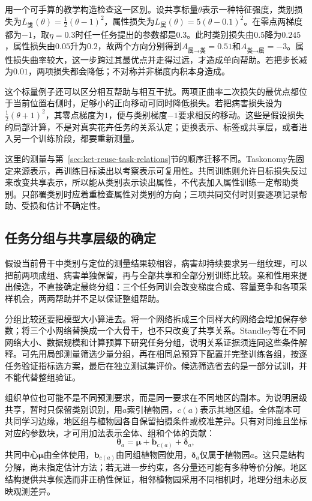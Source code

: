 用一个可手算的教学构造检查这一区别。设共享标量$\theta$表示一种特征强度，类别损失为$L_{\text{类}}(\theta)=\tfrac12(\theta-1)^2$，属性损失为$L_{\text{属}}(\theta)=5(\theta-0.1)^2$。在零点两梯度都为$-1$，取$\eta=0.3$时任一任务提出的参数都是$0.3$。此时类别损失由$0.5$降为$0.245$，属性损失由$0.05$升为$0.2$，故两个方向分别得到$A_{\text{属}\to\text{类}}=0.51$和$A_{\text{类}\to\text{属}}=-3$。属性损失曲率较大，这一步跨过其最优点并走得过远，才造成单向帮助。若把步长减为$0.01$，两项损失都会降低；不对称并非梯度内积本身造成。

这个标量例子还可以区分相互帮助与相互干扰。两项正曲率二次损失的最优点都位于当前位置右侧时，足够小的正向移动可同时降低损失。若把病害损失设为$\tfrac12(\theta+1)^2$，其零点梯度为$1$，便与类别梯度$-1$要求相反的移动。这些是假设损失的局部计算，不是对真实花卉任务的关系认定；更换表示、标签或共享层，或者进入另一个训练阶段，都要重新测量。

这里的测量与第~\ref{sec:ket-reuse-task-relations}节的顺序迁移不同。Taskonomy先固定来源表示，再训练目标读出以考察表示可复用性。共同训练则允许目标损失反过来改变共享表示，所以能从类别表示读出属性，不代表加入属性训练一定帮助类别。只部署类别时应着重检查属性对类别的方向；三项共同交付时则要逐项记录帮助、受损和估计不确定性。

\subsection{任务分组与共享层级的确定}
\label{sec:ket-sharing-grouping}

假设当前骨干中类别与定位的测量结果较相容，病害却持续要求另一组纹理，可以把前两项成组、病害单独保留，再与全部共享和全部分别训练比较。亲和性用来提出候选，不直接确定最终分组：三个任务同训会改变梯度合成、容量竞争和各项采样机会，两两帮助并不足以保证整组帮助。

分组比较还要把模型大小算进去。将一个网络拆成三个同样大的网络会增加保存参数；将三个小网络替换成一个大骨干，也不只改变了共享关系。Standley等在不同网络大小、数据规模和计算预算下研究任务分组，说明关系证据须连同这些条件解释。可先用局部测量筛选少量分组，再在相同总预算下配置并完整训练各组，按逐任务验证指标选方案，最后在独立测试集评价。候选筛选省去的是一部分试训，并不能代替整组验证。

组织单位也可能不是不同预测要求，而是同一要求在不同地区的副本。为说明层级共享，暂时只保留类别识别，用$a$索引植物园，$c(a)$表示其地区组。全体副本可共同学习边缘，地区组与植物园各自保留拍摄条件或校准差异。只有对同维且坐标对应的参数块，才可用加法表示全体、组和个体的贡献：
\begin{equation}
  \bm{\theta}_a
  =\bm{\mu}+\bm b_{c(a)}+\bm\delta_a,
  \label{eq:ket-sharing-hierarchy}
\end{equation}
共同中心$\bm{\mu}$由全体使用，$\bm b_{c(a)}$由同组植物园使用，$\bm\delta_a$仅属于植物园$a$。这只是结构分解，尚未指定估计方法；若无进一步约束，各分量还可能有多种等价分解。地区结构提供共享候选而非正确性保证，相邻植物园采用不同相机时，地理分组未必反映观测差异。

